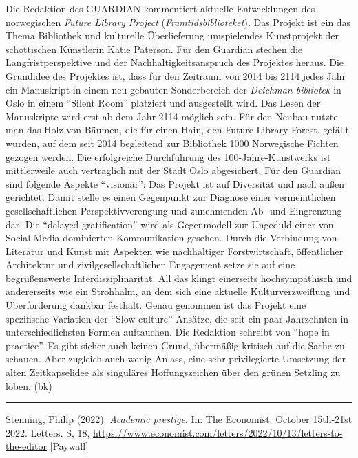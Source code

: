 \documentclass[a4paper,
fontsize=11pt,
oneside,
numbers=noperiodatend,
parskip=half-,
bibliography=totoc,
final
]{scrartcl}
\begin{document}
Die Redaktion des GUARDIAN kommentiert aktuelle Entwicklungen des
norwegischen \emph{Future Library Project} (\emph{Framtidsbiblioteket}).
Das Projekt ist ein das Thema Bibliothek und kulturelle Überlieferung
umspielendes Kunstprojekt der schottischen Künstlerin Katie Paterson.
Für den Guardian stechen die Langfristperspektive und der
Nachhaltigkeitsanspruch des Projektes heraus. Die Grundidee des
Projektes ist, dass für den Zeitraum von 2014 bis 2114 jedes Jahr ein
Manuskript in einem neu gebauten Sonderbereich der \emph{Deichman
bibliotek} in Oslo in einem \enquote{Silent Room} platziert und
ausgestellt wird. Das Lesen der Manuskripte wird erst ab dem Jahr 2114
möglich sein. Für den Neubau nutzte man das Holz von Bäumen, die für
einen Hain, den Future Library Forest, gefällt wurden, auf dem seit 2014
begleitend zur Bibliothek 1000 Norwegische Fichten gezogen werden. Die
erfolgreiche Durchführung des 100-Jahre-Kunstwerks ist mittlerweile auch
vertraglich mit der Stadt Oslo abgesichert. Für den Guardian sind
folgende Aspekte \enquote{visionär}: Das Projekt ist auf Diversität und
nach außen gerichtet. Damit stelle es einen Gegenpunkt zur Diagnose
einer vermeintlichen gesellschaftlichen Perspektivverengung und
zunehmenden Ab- und Eingrenzung dar. Die \enquote{delayed gratification}
wird als Gegenmodell zur Ungeduld einer von Social Media dominierten
Kommunikation gesehen. Durch die Verbindung von Literatur und Kunst mit
Aspekten wie nachhaltiger Forstwirtschaft, öffentlicher Architektur und
zivilgesellschaftlichen Engagement setze sie auf eine begrüßenswerte
Interdisziplinarität. All das klingt einerseits hochsympathisch und
andererseits wie ein Strohhalm, an dem sich eine aktuelle
Kulturverzweiflung und Überforderung dankbar festhält. Genau genommen
ist das Projekt eine spezifische Variation der \enquote{Slow
culture}-Ansätze, die seit ein paar Jahrzehnten in unterschiedlichsten
Formen auftauchen. Die Redaktion schreibt von \enquote{hope in
practice}. Es gibt sicher auch keinen Grund, übermäßig kritisch auf die
Sache zu schauen. Aber zugleich auch wenig Anlass, eine sehr
privilegierte Umsetzung der alten Zeitkapselidee als singuläres
Hoffungszeichen über den grünen Setzling zu loben. (bk)

\begin{center}\rule{0.5\linewidth}{0.5pt}\end{center}

Stenning, Philip (2022): \emph{Academic prestige}. In: The Economist.
October 15th-21st 2022. Letters. S, 18,
\url{https://www.economist.com/letters/2022/10/13/letters-to-the-editor}
{[}Paywall{]}
\end{document}
